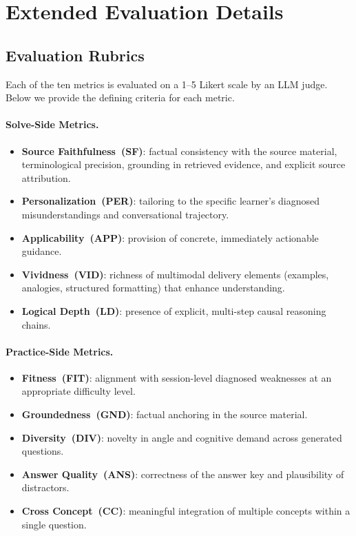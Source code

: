 \section{Extended Evaluation Details}
\label{app:eval}

\subsection{Evaluation Rubrics}
\label{app:eval:rubrics}

Each of the ten metrics is evaluated on a 1--5 Likert scale by an LLM judge.
Below we provide the defining criteria for each metric.

\paragraph{Solve-Side Metrics.}
\begin{itemize}[nosep,leftmargin=*]
\item \textbf{Source Faithfulness~(SF)}: factual consistency with the source material, terminological precision, grounding in retrieved evidence, and explicit source attribution.
\item \textbf{Personalization~(PER)}: tailoring to the specific learner's diagnosed misunderstandings and conversational trajectory.
\item \textbf{Applicability~(APP)}: provision of concrete, immediately actionable guidance.
\item \textbf{Vividness~(VID)}: richness of multimodal delivery elements (examples, analogies, structured formatting) that enhance understanding.
\item \textbf{Logical Depth~(LD)}: presence of explicit, multi-step causal reasoning chains.
\end{itemize}

\paragraph{Practice-Side Metrics.}
\begin{itemize}[nosep,leftmargin=*]
\item \textbf{Fitness~(FIT)}: alignment with session-level diagnosed weaknesses at an appropriate difficulty level.
\item \textbf{Groundedness~(GND)}: factual anchoring in the source material.
\item \textbf{Diversity~(DIV)}: novelty in angle and cognitive demand across generated questions.
\item \textbf{Answer Quality~(ANS)}: correctness of the answer key and plausibility of distractors.
\item \textbf{Cross Concept~(CC)}: meaningful integration of multiple concepts within a single question.
\end{itemize}

